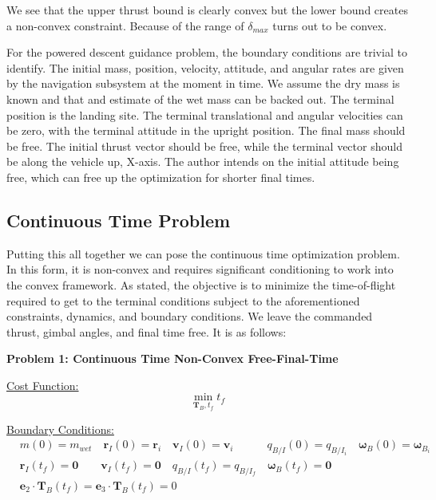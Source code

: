 \documentclass[conf]{new-aiaa}
\begin{document}
\begin{singlespace}
We see that the upper thrust bound is clearly convex but the lower bound creates a non-convex constraint. Because of the range of  $\delta_{max}$ turns out to be convex.

For the powered descent guidance problem, the boundary conditions are trivial to identify. The initial mass, position, velocity, attitude, and angular rates are given by the navigation subsystem at the moment in time. We assume the dry mass is known and that and estimate of the wet mass can be backed out. The terminal position is the landing site. The terminal translational and angular velocities can be zero, with the terminal attitude in the upright position. The final mass should be free. The initial thrust vector should be free, while the terminal vector should be along the vehicle up, X-axis. The author intends on the initial attitude being free, which can free up the optimization for shorter final times.

\clearpage
\subsection{Continuous Time Problem}
Putting this all together we can pose the continuous time optimization problem. In this form, it is non-convex and requires significant conditioning to work into the convex framework. As stated, the objective is to minimize the time-of-flight required to get to the terminal conditions subject to the aforementioned constraints, dynamics, and boundary conditions. We leave the commanded thrust, gimbal angles, and final time free. It is as follows:


\begin{mdframed}
\textbf{Problem 1: Continuous Time Non-Convex Free-Final-Time}

\underline{Cost Function:}
\begin{equation*}
\min_{\mathbf{T}_B, t_f} t_f
\end{equation*}

\underline{Boundary Conditions:}  
\begin{align*}
& m(0) = m_{wet} \quad \mathbf{r}_I(0) = \mathbf{r}_i \quad \mathbf{v}_I(0) = \mathbf{v}_i \quad \quad \quad{q}_{B/I}(0) = {q}_{B/I _{i}} \quad \bm{\omega}_B(0) = \bm{\omega}_{B _{i}} \\
& \mathbf{r}_I(t_f) = \mathbf{0} \quad \quad \mathbf{v}_I(t_f) = \mathbf{0} \quad {q}_{B/I}(t_f) = {q}_{B/I _ {f}} \quad \bm{\omega}_B(t_f) = \mathbf{0} \\
& \mathbf{e}_2 \cdot \mathbf{T}_B(t_f) = \mathbf{e}_3 \cdot \mathbf{T}_B(t_f) = 0
\end{align*}


\end{mdframed}
\end{singlespace}
\end{document}
